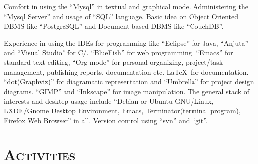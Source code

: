 \begin{resume}
\dates{}
\begin{position}
Comfort in using the ``Mysql'' in textual and graphical mode.
Administering the ``Mysql Server'' and usage of ``SQL'' language.
Basic idea on Object Oriented DBMS like ``PostgreSQL'' and Document
based DBMS like ``CouchDB''.
\end{position}

\dates{}
\begin{position}
Experience in using the IDEs for programming like ``Eclipse'' for Java,
``Anjuta'' and ``Visual Studio'' for C/\Cplusplus. ``BlueFish'' for web
programming. ``Emacs'' for standard text editing, ``Org-mode'' for
personal organizing, project/task management, publishing reports,
documentation etc. \LaTeX \ for documentation. ``dot(Graphviz)'' for
diagramatic representation and ``Umbrella'' for project design
diagrams. ``GIMP'' and ``Inkscape'' for image manipulation. The
general stack of interests and desktop usage include ``Debian or
Ubuntu GNU/Linux, LXDE/Gnome Desktop Environment, Emacs,
Terminator(terminal program), Firefox Web Browser'' in all. Version
control using ``svn'' and ``git''.
\end{position} 







\section{\textsc{Activities}}

\begin{formatb}
  \\
  \body\\
\end{formatb}


\end{resume}
